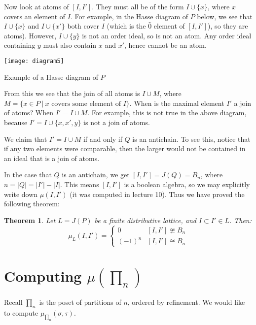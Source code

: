 \documentclass[11pt]{article}
\newtheorem{theorem}{Theorem}
\begin{document}
Now look at atoms of $[I,I']$. They must all be of the form $I\cup \{x\}$, where $x$ covers an element of $I$. For example, in the Hasse diagram of $P$ below, we see that $I\cup \{x\}$ and $I\cup \{x'\}$ both cover $I$ (which is the $\hat{0}$ element of $[I,I']$), so they are atoms). However, $I\cup \{y\}$ is not an order ideal, so is not an atom.  Any order ideal containing $y$ must also contain $x$ and $x'$, hence cannot be an atom. 

\begin{center}
\texttt{[image: diagram5]}

Example of a Hasse diagram of $P$
\end{center}


From this we see that the join of all atoms is $I\cup M$, where $M=\{x\in P \: | \: x \mbox{ covers some element of } I \}$. When is the maximal element $I'$ a join of atoms? When $I'=I\cup M$.  For example, this is not true in the above diagram, because $I'=I\cup\{x,x',y\}$ is not a join of atoms. 

We claim that $I'=I\cup M$ if and only if $Q$ is an antichain. To see this, notice that if any two elements were comparable, then the larger would not be contained in an ideal that is a join of atoms. 

In the case that $Q$ is an antichain, we get $[I,I']=J(Q)=B_n$, where $n=|Q|=|I'|-|I|$. This means $[I,I']$ is a boolean algebra, so we may explicitly write down $\mu(I,I')$ (it was computed in lecture 10). Thus we have proved the following theorem:

\begin{theorem}\label{mu thm}
Let $L=J(P)$ be a finite distributive lattice, and $I\subset I' \in L$. Then:
\begin{displaymath}
  \mu_L(I,I') = \left\{
     \begin{array}{lr}
       0 & [I,I'] \ncong B_n\\
       (-1)^n & [I,I'] \cong B_n
      \end{array}
   \right.
\end{displaymath} 
\end{theorem}

\section{Computing $\mu(\prod_n)$}

Recall $\prod_n$ is the poset of partitions of $n$, ordered by refinement. We would like to compute $\mu_{\prod_n}(\sigma,\tau)$. 
\end{document}
